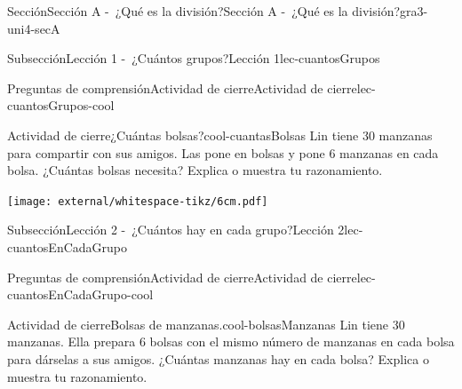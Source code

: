 \begin{sectionptx}{Sección}{Sección A -~¿Qué es la división?}{}{Sección A -~¿Qué es la división?}{}{}{gra3-uni4-secA}
%
%
\cleardoublepage
\typeout{************************************************}
\typeout{************************************************}
%
\begin{subsectionptx}{Subsección}{Lección 1 -~¿Cuántos grupos?}{}{Lección 1}{}{}{lec-cuantosGrupos}
%
%
\typeout{************************************************}
\typeout{************************************************}
%
\begin{reading-questions-subsubsection-numberless}{Preguntas de comprensión}{Actividad de cierre}{}{Actividad de cierre}{}{}{lec-cuantosGrupos-cool}
\begin{project}{Actividad de cierre}{¿Cuántas bolsas?}{cool-cuantasBolsas}%
Lin tiene 30 manzanas para compartir con sus amigos. Las pone en bolsas y pone 6 manzanas en cada bolsa. ¿Cuántas bolsas necesita? Explica o muestra tu razonamiento.%
\begin{image}{0}{1}{0}{}%
\texttt{[image: external/whitespace-tikz/6cm.pdf]}
\end{image}%
\end{project}%
\end{reading-questions-subsubsection-numberless}
\end{subsectionptx}
%
%
\typeout{************************************************}
\typeout{************************************************}
%
\begin{subsectionptx}{Subsección}{Lección 2 -~¿Cuántos hay en cada grupo?}{}{Lección 2}{}{}{lec-cuantosEnCadaGrupo}
%
%
\typeout{************************************************}
\typeout{************************************************}
%
\begin{reading-questions-subsubsection-numberless}{Preguntas de comprensión}{Actividad de cierre}{}{Actividad de cierre}{}{}{lec-cuantosEnCadaGrupo-cool}
\begin{project}{Actividad de cierre}{Bolsas de manzanas.}{cool-bolsasManzanas}%
Lin tiene 30 manzanas. Ella prepara 6 bolsas con el mismo número de manzanas en cada bolsa para dárselas a sus amigos. ¿Cuántas manzanas hay en cada bolsa? Explica o muestra tu razonamiento.%
\begin{image}{0}{1}{0}{}%

\end{image}
\end{project}
\end{reading-questions-subsubsection-numberless}
\end{subsectionptx}
\end{sectionptx}
